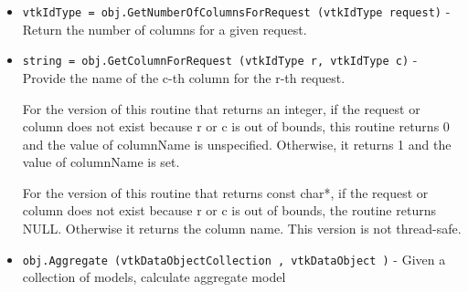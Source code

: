 \begin{itemize}
\item  \verb|vtkIdType = obj.GetNumberOfColumnsForRequest (vtkIdType request)| -  Return the number of columns for a given request.

\item  \verb|string = obj.GetColumnForRequest (vtkIdType r, vtkIdType c)| -  Provide the name of the  c-th column for the  r-th request.

 For the version of this routine that returns an integer,
 if the request or column does not exist because  r or  c is out of bounds,
 this routine returns 0 and the value of  columnName is unspecified.
 Otherwise, it returns 1 and the value of  columnName is set.

 For the version of this routine that returns const char*,
 if the request or column does not exist because  r or  c is out of bounds,
 the routine returns NULL. Otherwise it returns the column name.
 This version is not thread-safe.

\item  \verb|obj.Aggregate (vtkDataObjectCollection , vtkDataObject )| -  Given a collection of models, calculate aggregate model

\end{itemize}

